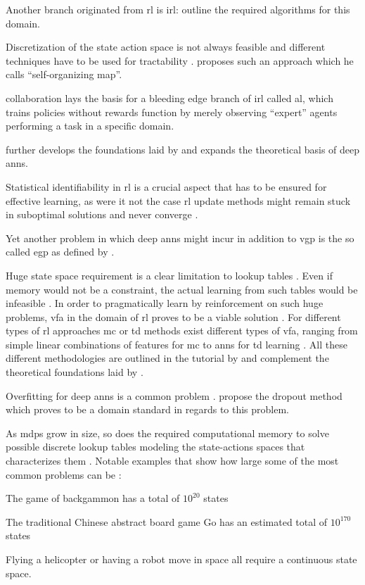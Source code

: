 Another branch originated from \gls{rl} is \gls{irl}: \citet{Ng2000} outline the required algorithms for this domain.

Discretization of the state action space is not always feasible and different techniques have to be used for tractability \citep{Smith2002}. \citet{Smith2002} proposes such an approach which he calls ``self-organizing map''.

\citet{Abbeel2004} collaboration lays the basis for a bleeding edge branch of \gls{irl} called \gls{al}, which trains policies without rewards function by merely observing ``expert'' agents performing a task in a specific domain.

\citet{Bengio2009} further develops the foundations laid by \citet{Lecun1998} and expands the theoretical basis of deep \glspl{ann}.

Statistical identifiability in \gls{rl} is a crucial aspect that has to be ensured for effective learning, as were it not the case \gls{rl} update methods might remain stuck in suboptimal solutions and never converge \citep{Zhang2011}.

Yet another problem in which deep \glspl{ann} might incur in addition to \gls{vgp} is the so called \gls{egp} as defined by \citet{Pascanu2012}.

Huge state space requirement is a clear limitation to lookup tables \citep{Sutton2017}. Even if memory would not be a constraint, the actual learning from such tables would be infeasible \citep{Sutton2017}. In order to pragmatically learn by reinforcement on such huge problems, \gls{vfa} in the domain of \gls{rl} proves to be a viable solution \citep{Sutton2017}. For different types of \gls{rl} approaches \ie \gls{mc} or \gls{td} methods exist different types of \gls{vfa}, ranging from simple linear combinations of features for \gls{mc} to \glspl{ann} for \gls{td} learning \citep{Sutton2017}. All these different methodologies are outlined in the tutorial by \citet{Geramifard2013} and complement the theoretical foundations laid by \citet{Sutton2017}.

Overfitting for deep \glspl{ann} is a common problem \citep[p. 218]{Sutton2017}. \citet{Srivastava2014} propose the dropout method which proves to be a domain standard in regards to this problem.

As \glspl{mdp} grow in size, so does the required computational memory to solve possible discrete lookup tables modeling the state-actions spaces that characterizes them \citep{Sutton2017}. Notable examples that show how large some of the most common problems can be \citep{Sutton2017}:
\begin{enumerate*}
	\item The game of backgammon has a total of $10^{20}$ states
	\item The traditional Chinese abstract board game Go has an estimated total of $10^{170}$ states
	\item Flying a helicopter or having a robot move in space all require a continuous state space.
\end{enumerate*}

